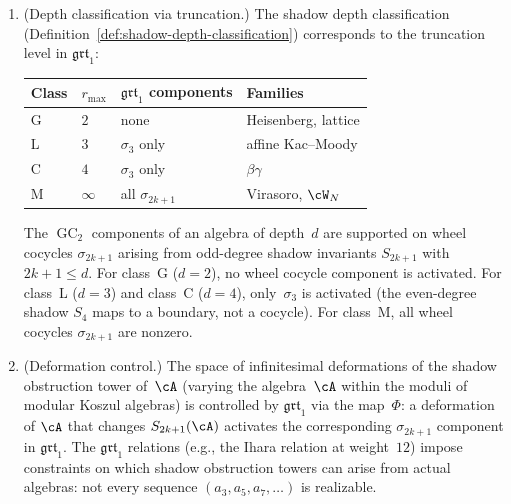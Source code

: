\begin{conjecture}
\begin{enumerate}[label=\textup{(\roman*)}]
\item \textup{(Depth classification via truncation.)}
 The shadow depth classification
 \textup{(}Definition~\textup{\ref{def:shadow-depth-classification})}
 corresponds to the truncation level in
 $\mathfrak{grt}_1$:
 \begin{center}
 \renewcommand{\arraystretch}{1.15}
 \begin{tabular}{llll}
 Class & $r_{\max}$ & $\mathfrak{grt}_1$ components & Families \\
 \hline
 G & $2$ & none
 & Heisenberg, lattice \\
 L & $3$ & $\sigma_3$ only
 & affine Kac--Moody \\
 C & $4$ & $\sigma_3$ only
 & $\beta\gamma$ \\
 M & $\infty$ & all $\sigma_{2k+1}$
 & Virasoro, $\cW_N$
 \end{tabular}
 \end{center}
 The $\operatorname{GC}_2$ components of an algebra of depth~$d$
 are supported on wheel cocycles $\sigma_{2k+1}$
 arising from odd-degree shadow invariants $S_{2k+1}$ with
 $2k + 1 \leq d$. For class~G ($d = 2$), no wheel cocycle
 component is activated. For class~L ($d = 3$) and class~C
 ($d = 4$), only~$\sigma_3$ is activated (the even-degree
 shadow $S_4$ maps to a boundary, not a cocycle).
 For class~M, all wheel cocycles $\sigma_{2k+1}$ are nonzero.

\item \textup{(Deformation control.)}
 The space of infinitesimal deformations of the shadow obstruction tower
 of~$\cA$ \textup{(}varying the algebra~$\cA$ within the
 moduli of modular Koszul algebras\textup{)} is controlled by
 $\mathfrak{grt}_1$ via the map~$\Phi$:
 a deformation of $\cA$ that changes $S_{2k+1}(\cA)$
 activates the corresponding $\sigma_{2k+1}$ component
 in $\mathfrak{grt}_1$. The $\mathfrak{grt}_1$ relations
 \textup{(}e.g., the Ihara relation at weight~$12$\textup{)} impose
 constraints on which shadow obstruction towers can arise from actual
 algebras: not every sequence $(a_3, a_5, a_7, \ldots)$ is
 realizable.
\end{enumerate}
\end{conjecture}

